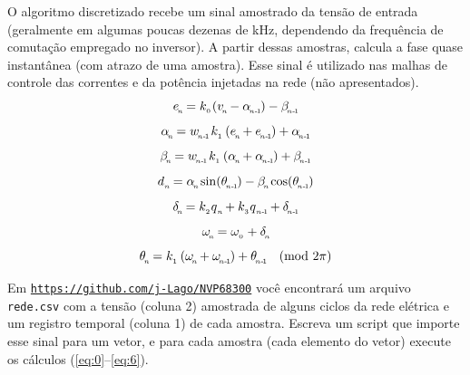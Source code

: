 O algoritmo discretizado recebe um sinal amostrado da tensão de entrada (geralmente em algumas poucas dezenas de kHz, dependendo da frequência de
comutação empregado no inversor).
A partir dessas amostras, calcula a fase quase instantânea (com atrazo de uma amostra).
Esse sinal é utilizado nas malhas de controle das correntes e da potência injetadas na rede (não apresentados).
\begin{equation}\label{eq:0}
        e\0 = k_{_0\!} \left( v\0 - \alpha\1 \right)  - \beta\1
\end{equation}
\begin{equation}\label{eq:1}
    \alpha\0 = w\1  \, k_{_1}  \left( e\0 + e\1 \right)  + \alpha\1
\end{equation}
\begin{equation}\label{eq:2}
    \beta\0 = w\1  \, k_{_1}  \left( \alpha\0 + \alpha\1 \right)  + \beta\1
\end{equation}
\begin{equation}\label{eq:3a}
    d{_{_{ n\!}}} =  \alpha\0 \sin(\theta\1) - \beta\0  \cos(\theta\1)
\end{equation}
\begin{equation}\label{eq:4}
    \delta\0 = k_{_2} q{_{_{ n\!}}} + k_{_3} q{_{_{ n\text{-}\!\>\!1\!}}} + \delta\1
\end{equation}
\begin{equation}\label{eq:5}
    \omega_{_{\! n\!}}  = \omega_{_0} + \delta_{_{\! n\!}}
\end{equation}
\begin{equation}\label{eq:6}
    \theta\0 = k_{_1}  \left( \omega\0 + \omega\1 \right)  + \theta\1    \ \ \  (\text{mod}~2\pi)
\end{equation}


Em \texttt{\url{https://github.com/j-Lago/NVP68300}} você encontrará um arquivo \texttt{rede.csv} com a tensão (coluna 2) amostrada de alguns
ciclos da rede elétrica e um registro temporal (coluna 1) de cada amostra.
Escreva um script que importe esse sinal para um vetor, e para cada amostra (cada elemento do vetor) execute os cálculos (\ref{eq:0}--\ref{eq:6}).

